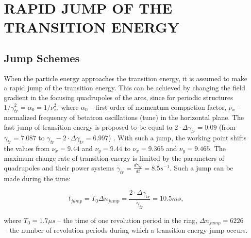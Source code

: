 \documentclass[a4paper]{jpconf}
\begin{document}
\section{RAPID JUMP OF THE TRANSITION ENERGY}
\subsection{Jump Schemes}
\par When the particle energy approaches the transition energy, it is assumed to make a rapid jump of the transition energy. This can be achieved by changing the field gradient in the focusing quadrupoles of the arcs, since for periodic structures $1/\gamma_{tr}^{2}=\alpha_{0}=1/\nu_{x}^{2}$, where $\alpha_{0}$ – first order of momentum compaction factor, $\nu_{x}$ – normalized frequency of betatron oscillations (tune) in the horizontal plane. The fast jump of transition energy is proposed to be equal to $2\cdot\Delta\gamma_{tr}=0.09$ (from $\gamma_{tr}=7.087$ to $\gamma_{tr}-2\cdot\Delta\gamma_{tr}=6.997$) \cite{NICA}. With such a jump, the working point shifts the values from $\nu_{x}=9.44$ and $\nu_{y}=9.44$ to  $\nu_{x}=9.365$ and $\nu_{y}=9.465$. The maximum change rate of transition energy is limited by the parameters of quadrupoles and their power systems $\dot\gamma_{tr}=\frac{d\gamma_{tr}}{dt}=8.5 s^{-1}$. Such a jump can be made during the time:

\begin{equation}\label{eq:jump_time}
t_{jump}=T_{0} \Delta n_{jump}=\frac{2\cdot\Delta\gamma_{tr}}{\dot{\gamma}_{tr}}=10.5 ms,
\end{equation}

\noindent where $T_{0}=1.7 \mu s$ – the time of one revolution period in the ring, $\Delta n_{jump}= 6226$ – the number of revolution periods during which a transition energy jump occurs.
\end{document}
